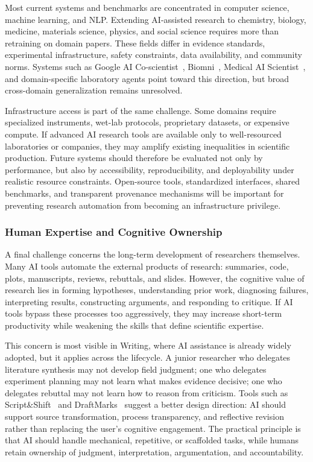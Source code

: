 Most current systems and benchmarks are concentrated in computer science, machine learning, and NLP. Extending AI-assisted research to chemistry, biology, medicine, materials science, physics, and social science requires more than retraining on domain papers. These fields differ in evidence standards, experimental infrastructure, safety constraints, data availability, and community norms. Systems such as Google AI Co-scientist~\cite{gottweis2025aicoscientist}, Biomni~\cite{biomni2025}, Medical AI Scientist~\cite{medicalaiscientist2026}, and domain-specific laboratory agents point toward this direction, but broad cross-domain generalization remains unresolved.

Infrastructure access is part of the same challenge. Some domains require specialized instruments, wet-lab protocols, proprietary datasets, or expensive compute. If advanced AI research tools are available only to well-resourced laboratories or companies, they may amplify existing inequalities in scientific production. Future systems should therefore be evaluated not only by performance, but also by accessibility, reproducibility, and deployability under realistic resource constraints. Open-source tools, standardized interfaces, shared benchmarks, and transparent provenance mechanisms will be important for preventing research automation from becoming an infrastructure privilege.


\subsubsection{Human Expertise and Cognitive Ownership}

A final challenge concerns the long-term development of researchers themselves. Many AI tools automate the external products of research: summaries, code, plots, manuscripts, reviews, rebuttals, and slides. However, the cognitive value of research lies in forming hypotheses, understanding prior work, diagnosing failures, interpreting results, constructing arguments, and responding to critique. If AI tools bypass these processes too aggressively, they may increase short-term productivity while weakening the skills that define scientific expertise.

This concern is most visible in Writing, where AI assistance is already widely adopted, but it applies across the lifecycle. A junior researcher who delegates literature synthesis may not develop field judgment; one who delegates experiment planning may not learn what makes evidence decisive; one who delegates rebuttal may not learn how to reason from criticism. Tools such as Script\&Shift~\cite{siddiqui2025scriptshift} and DraftMarks~\cite{siddiqui2025draftmarks} suggest a better design direction: AI should support source transformation, process transparency, and reflective revision rather than replacing the user's cognitive engagement. The practical principle is that AI should handle mechanical, repetitive, or scaffolded tasks, while humans retain ownership of judgment, interpretation, argumentation, and accountability.


